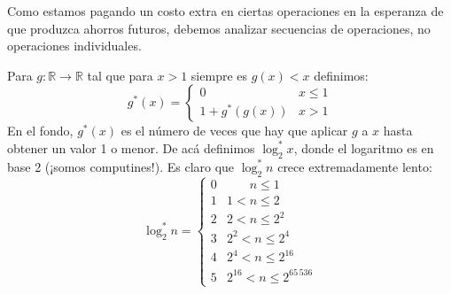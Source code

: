   Como estamos pagando un costo extra en ciertas operaciones
  en la esperanza de que produzca ahorros futuros,
  debemos analizar secuencias de operaciones,
  no operaciones individuales.

  Para \(g \colon \mathbb{R} \to \mathbb{R}\)
  tal que para \(x > 1\) siempre es \(g(x) < x\) definimos:
  \begin{equation}
    \label{eq:def-g*}
    g^*(x)
      = \begin{cases}
          0		& x \le 1 \\
          1 + g^*(g(x))	& x >	1
        \end{cases}
  \end{equation}
  En el fondo, \(g^*(x)\) es el número de veces
  que hay que aplicar \(g\) a \(x\)
  hasta obtener un valor \num{1} o menor.
  De acá definimos \(\log_2^* x\),
  donde el logaritmo es en base \num{2}
  (¡somos computines!).
  Es claro que \(\log_2^* n\) crece extremadamente lento:
  \begin{equation*}
    \log_2^* n
      = \begin{cases}
           0 & \phantom{1 < {}}
                        n \le 1	  \\
           1 & 1      < n \le 2	  \\
           2 & 2      < n \le 2^2 \\
           3 & 2^2    < n \le 2^4 \\
           4 & 2^4    < n \le 2^{16} \\
           5 & 2^{16} < n \le 2^{65\,536}
        \end{cases}
  \end{equation*}

